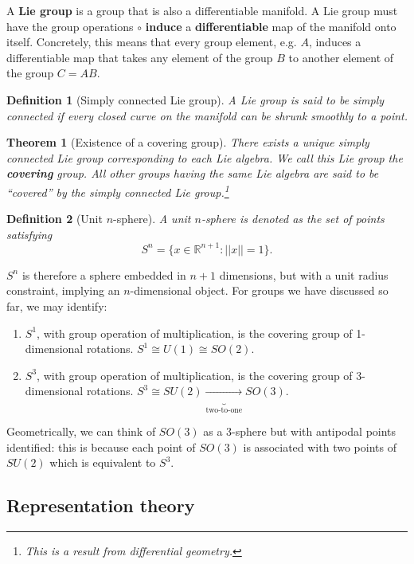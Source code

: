 \documentclass[11pt]{article}
\numberwithin{equation}{section}
\newtheorem{thm}{Theorem}[section]
\newtheorem{defn}{Definition}[section]
\begin{document}
A \textbf{Lie group} is a group that is also a differentiable manifold. A Lie group must have the group operations $\circ$ \textbf{induce} a \textbf{differentiable} map of the manifold onto itself. Concretely, this means that every group element, e.g. $A$, induces a differentiable map that takes any element of the group $B$ to another element of the group $C=AB$. 

\begin{defn}[Simply connected Lie group]
A Lie group is said to be simply connected if every closed curve on the manifold can be shrunk smoothly to a point. 
\end{defn}

\begin{thm}[Existence of a covering group]
There exists a unique simply connected Lie group corresponding to each Lie algebra. We call this Lie group the \textbf{covering} group. All other groups having the same Lie algebra are said to be ``covered'' by the simply connected Lie group.\footnote{This is a result from differential geometry.} 
\end{thm}

\begin{defn}[Unit $n$-sphere]
A unit $n$-sphere is denoted as the set of points satisfying
\begin{equation}
S^n=\{x \in \mathbb{R}^{n+1}: ||x||=1\}.
\end{equation}
\end{defn}

$S^n$ is therefore a sphere embedded in $n+1$ dimensions, but with a unit radius constraint, implying an $n$-dimensional object. For groups we have discussed so far, we may identify:
\begin{enumerate}
\item $S^1$, with group operation of multiplication, is the covering group of 1-dimensional rotations. $S^1 \cong U(1) \cong SO(2)$.
\item $S^3$, with group operation of multiplication, is the covering group of 3-dimensional rotations. $S^3 \cong SU(2) \underbrace{\rightarrow}_{\text{two-to-one}}SO(3)$.
\end{enumerate}
Geometrically, we can think of $SO(3)$ as a 3-sphere but with antipodal points identified: this is because each point of $SO(3)$ is associated with two points of $SU(2)$ which is equivalent to $S^3$. 

\subsection{Representation theory}
\end{document}
